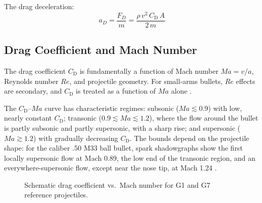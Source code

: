 \documentclass[11pt,twoside,openright]{report}
\newcommand{\Cd}{C_{\mathrm{D}}}
\newcommand{\Mach}{\mathit{Ma}}
\newcommand{\Rey}{\mathit{Re}}
\begin{document}
The drag deceleration:
\begin{equation}
  a_D = \frac{F_D}{m} = \frac{\rho\,v^2\,\Cd\,A}{2\,m}
  \label{eq:drag_decel}
\end{equation}

\subsection{Drag Coefficient and Mach Number}

The drag coefficient $\Cd$ is fundamentally a function of Mach number $\Mach = v/a$, Reynolds number $\Rey$, and projectile geometry. For small-arms bullets, $\Rey$ effects are secondary, and $\Cd$ is treated as a function of $\Mach$ alone \citep{mccoy1999modern}.

The $\Cd$--$\Mach$ curve has characteristic regimes: subsonic ($\Mach \lesssim 0.9$) with low, nearly constant $\Cd$; transonic ($0.9 \lesssim \Mach \lesssim 1.2$), where the flow around the bullet is partly subsonic and partly supersonic, with a sharp rise; and supersonic ($\Mach \gtrsim 1.2$) with gradually decreasing $\Cd$. The bounds depend on the projectile shape: for the caliber .50 M33 ball bullet, spark shadowgraphs show the first locally supersonic flow at Mach 0.89, the low end of the transonic region, and an everywhere-supersonic flow, except near the nose tip, at Mach 1.24 \citep[p.~58]{mccoy1999modern}.

\begin{figure}[H]
\centering
{}
\caption{Schematic drag coefficient vs.\ Mach number for G1 and G7 reference projectiles.}
\label{fig:cd_mach}
\end{figure}
\end{document}

